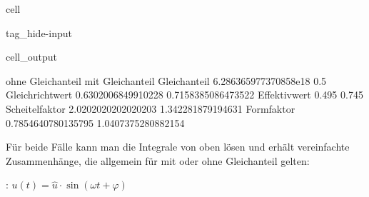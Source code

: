 \documentclass[letterpaper,10pt,english]{jupyterBook}
\begin{document}
\begin{sphinxuseclass}{cell}
\begin{sphinxuseclass}{tag_hide-input}\begin{sphinxVerbatimOutput}

\begin{sphinxuseclass}{cell_output}
\noindent{}

\begin{sphinxVerbatim}[commandchars=\\\{\}]
		 ohne Gleichanteil 		 mit Gleichanteil
\PYGZhy{}\PYGZhy{}\PYGZhy{}\PYGZhy{}\PYGZhy{}\PYGZhy{}\PYGZhy{}\PYGZhy{}\PYGZhy{}\PYGZhy{}\PYGZhy{}\PYGZhy{}\PYGZhy{}\PYGZhy{}\PYGZhy{}\PYGZhy{}\PYGZhy{}\PYGZhy{}\PYGZhy{}\PYGZhy{}\PYGZhy{}\PYGZhy{}\PYGZhy{}\PYGZhy{}\PYGZhy{}\PYGZhy{}\PYGZhy{}\PYGZhy{}\PYGZhy{}\PYGZhy{}\PYGZhy{}\PYGZhy{}\PYGZhy{}\PYGZhy{}\PYGZhy{}\PYGZhy{}\PYGZhy{}\PYGZhy{}\PYGZhy{}\PYGZhy{}\PYGZhy{}\PYGZhy{}\PYGZhy{}\PYGZhy{}\PYGZhy{}\PYGZhy{}\PYGZhy{}\PYGZhy{}\PYGZhy{}\PYGZhy{}\PYGZhy{}\PYGZhy{}\PYGZhy{}\PYGZhy{}\PYGZhy{}\PYGZhy{}\PYGZhy{}\PYGZhy{}\PYGZhy{}\PYGZhy{}\PYGZhy{}\PYGZhy{}\PYGZhy{}\PYGZhy{}\PYGZhy{}\PYGZhy{}\PYGZhy{}
Gleichanteil	 \PYGZhy{}6.286365977370858e\PYGZhy{}18 	 0.5
Gleichrichtwert	 0.6302006849910228 		 0.7158385086473522
Effektivwert	 0.495 				 0.745
Scheitelfaktor	 2.0202020202020203 		 1.342281879194631
Formfaktor	 0.7854640780135795 		 1.0407375280882154
\end{sphinxVerbatim}

\end{sphinxuseclass}\end{sphinxVerbatimOutput}

\end{sphinxuseclass}
\end{sphinxuseclass}
\sphinxAtStartPar
Für beide Fälle kann man die Integrale von oben lösen und erhält vereinfachte Zusammenhänge, die allgemein für  mit oder ohne Gleichanteil gelten:

\sphinxAtStartPar
{}: \(u(t) = \hat{u}\cdot \sin(\omega t + \varphi )\)
\end{document}
